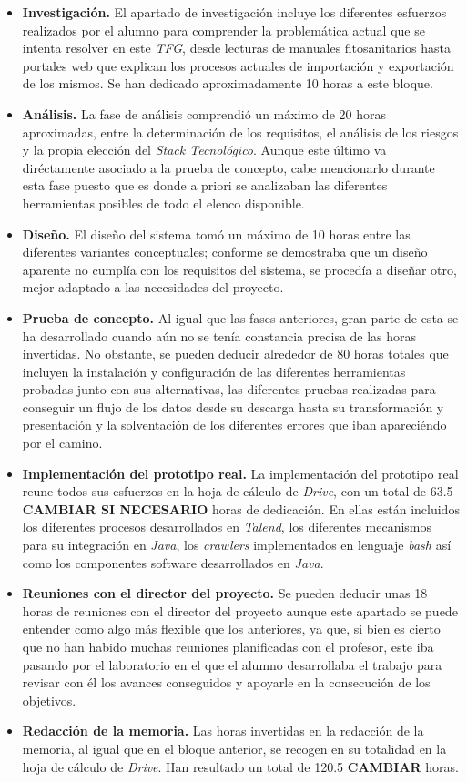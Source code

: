 \begin{itemize}
\item \textbf{Investigación. } El apartado de investigación incluye los diferentes esfuerzos realizados por el alumno para comprender la problemática actual que se intenta resolver en este \textit{TFG}, desde lecturas de manuales fitosanitarios hasta portales web que explican los procesos actuales de importación y exportación de los mismos. Se han dedicado aproximadamente 10 horas a este bloque.
\item \textbf{Análisis. } La fase de análisis comprendió un máximo de 20 horas aproximadas, entre la determinación de los requisitos, el análisis de los riesgos y la propia elección del \textit{Stack Tecnológico}. Aunque este último va diréctamente asociado a la prueba de concepto, cabe mencionarlo durante esta fase puesto que es donde a priori se analizaban las diferentes herramientas posibles de todo el elenco disponible. 
\item \textbf{Diseño. } El diseño del sistema tomó un máximo de 10 horas entre las diferentes variantes conceptuales; conforme se demostraba que un diseño aparente no cumplía con los requisitos del sistema, se procedía a diseñar otro, mejor adaptado a las necesidades del proyecto. 
\item \textbf{Prueba de concepto. } Al igual que las fases anteriores, gran parte de esta se ha desarrollado cuando aún no se tenía constancia precisa de las horas invertidas. No obstante, se pueden deducir alrededor de 80 horas totales que incluyen la instalación y configuración de las diferentes herramientas probadas junto con sus alternativas, las diferentes pruebas realizadas para conseguir un flujo de los datos desde su descarga hasta su transformación y presentación y la solventación de los diferentes errores que iban apareciéndo por el camino. 
\item \textbf{Implementación del prototipo real. } La implementación del prototipo real reune todos sus esfuerzos en la hoja de cálculo de \textit{Drive}, con un total de 63.5 \textbf{CAMBIAR SI NECESARIO} horas de dedicación. En ellas están incluidos los diferentes procesos desarrollados en \textit{Talend}, los diferentes mecanismos para su integración en \textit{Java}, los \textit{crawlers} implementados en lenguaje \textit{bash} así como los  componentes software desarrollados en \textit{Java}. 
\item \textbf{Reuniones con el director del proyecto. } Se pueden deducir unas 18 horas de reuniones con el director del proyecto aunque este apartado se puede entender como algo más flexible que los anteriores, ya que, si bien es cierto que no han habido muchas reuniones planificadas con el profesor, este iba pasando por el laboratorio en el que el alumno desarrollaba el trabajo para revisar con él los avances conseguidos y apoyarle en la consecución de los objetivos. 
\item \textbf{Redacción de la memoria. } Las horas invertidas en la redacción de la memoria, al igual que en el bloque anterior, se recogen en su totalidad en la hoja de cálculo de \textit{Drive}. Han resultado un total de 120.5 \textbf{CAMBIAR} horas.
\end{itemize}

